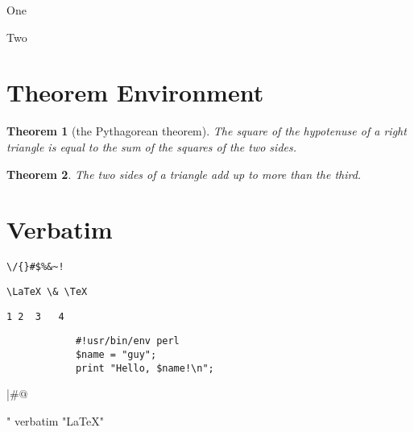 \documentclass{article}
\newenvironment{mycenter}{%
    \begin{trivlist}
        \centering\item[]}     
    {\end{trivlist}}
\newtheorem{thm}{Theorem}[section]      %
\begin{document}
            \begin{mycenter}
                One\par
                Two
            \end{mycenter} 
    \section{Theorem Environment}
        \begin{thm}[the Pythagorean theorem]
            The square of the hypotenuse of a right triangle is equal to 
            the sum of the squares of the two sides. 
        \end{thm}
        \begin{thm}
            The two sides of a triangle add up to more than the third. 
        \end{thm}
    \section{Verbatim}
        \verb"\/{}#$%&~!"\par
        \verb!\LaTeX \& \TeX!\par
        \verb*"1 2  3   4"
        
        \begin{verbatim}
            #!usr/bin/env perl
            $name = "guy"; 
            print "Hello, $name!\n"; 
        \end{verbatim}
        \usebox\verbbox \fbox{\usebox\verbbox}\par
        |#$@$%^&|
        \par
        %  
        \cprotect{}\par
        {                               % NOTICE: The symbol you define may conflict with some commands you use behind. 
            \MakeShortVerb"             %
            verbatim "\LaTeX"
        }
\end{document}
